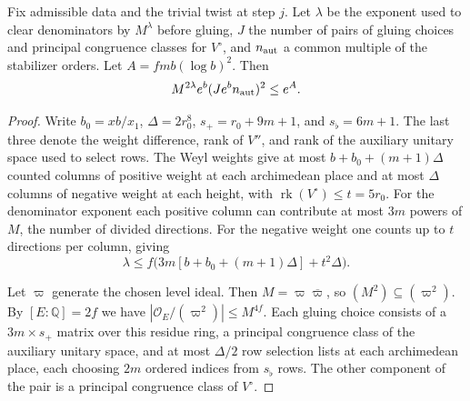 \begin{lemma}
\label{lem:c-gluing-norm-budget}
\emitthmsource
Fix admissible data and the trivial twist at step $j$. Let $\lambda$ be the exponent used to clear denominators by $M^\lambda$ before gluing, $J$ the number of pairs of gluing choices and principal congruence classes for $V^\circ$, and $n_{\rm aut}$ a common multiple of the stabilizer orders. Let $A=fmb(\log b)^2$. Then
\[
 M^{2\lambda} e^b (J e^b n_{\rm aut})^2\le e^A.
\]
\end{lemma}

\begin{proof}
Write $b_0=xb/x_1$, $\Delta=2r_0^8$, $s_+=r_0+9m+1$, and $s_\flat=6m+1$. The last three denote the weight difference, rank of $V''$, and rank of the auxiliary unitary space used to select rows. The Weyl weights give at most $b+b_0+(m+1)\Delta$ counted columns of positive weight at each archimedean place and at most $\Delta$ columns of negative weight at each height, with $\operatorname{rk}(V^\circ)\le t=5r_0$. For the denominator exponent each positive column can contribute at most $3m$ powers of $M$, the number of divided directions. For the negative weight one counts up to $t$ directions per column, giving
\[
 \lambda\le f\bigl(3m[b+b_0+(m+1)\Delta]+t^2\Delta\bigr).
\]

Let $\varpi$ generate the chosen level ideal. Then $M=\varpi\overline\varpi$, so $(M^2)\subseteq(\varpi^2)$. By $[E:\mathbb Q]=2f$ we have $|\mathcal O_E/(\varpi^2)|\le M^{4f}$. Each gluing choice consists of a $3m\times s_+$ matrix over this residue ring, a principal congruence class of the auxiliary unitary space, and at most $\Delta/2$ row selection lists at each archimedean place, each choosing $2m$ ordered indices from $s_\flat$ rows. The other component of the pair is a principal congruence class of $V^\circ$.


\end{proof}
